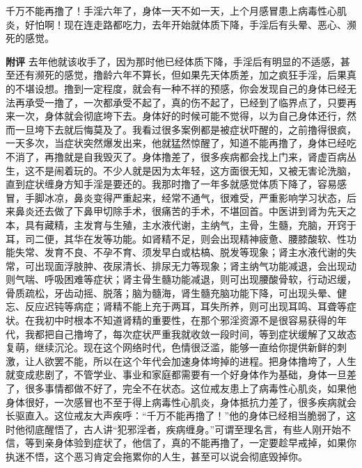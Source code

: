 \begin{case}
    千万不能再撸了！手淫六年了，身体一天不如一天，上个月感冒患上病毒性心肌炎，好怕啊！现在连走路都吃力，去年开始就体质下降，手淫后有头晕、恶心、濒死的感觉。

    \textbf{附评} 去年他就该收手了，因为那时他已经体质下降，手淫后有明显的不适感，甚至还有濒死的感觉，撸龄六年不算长，但如果先天体质差，加之疯狂手淫，后果真的不堪设想。撸到一定程度，就会有一种不祥的预感，你会发现自己的身体已经无法再承受一撸了，一次都承受不起了，真的伤不起了，已经到了临界点了，只要再来一次，身体就会彻底垮下去。身体好的时候可能不觉得，以为自己身体还行，然而一旦垮下去就后悔莫及了。我看过很多案例都是被症状吓醒的，之前撸得很疯，一天多次，当症状突然爆发出来，他就猛然惊醒了，知道不能再撸了，身体已经吃不消了，再撸就是自我毁灭了。身体撸差了，很多疾病都会找上门来，肾虚百病丛生，这不是闹着玩的。不少人就是因为太年轻，这方面很无知，又被无害论洗脑，直到症状缠身方知手淫是要还的。我那时撸了一年多就感觉体质下降了，容易感冒，手脚冰凉，鼻炎变得严重起来，经常不通气，很难受，严重影响学习状态，后来鼻炎还去做了下鼻甲切除手术，很痛苦的手术，不堪回首。中医讲到肾为先天之本，具有藏精，主发育与生殖，主水液代谢，主纳气，主骨，生髓，充脑，开窍于耳，司二便，其华在发等功能。如肾精不足，则会出现精神疲惫、腰膝酸软、性功能失常、发育不良、不孕不育、须发早白或枯槁、脱发等现象；肾主水液代谢的失常，可出现面浮肢肿、夜尿清长、排尿无力等现象；肾主纳气功能减退，会出现动则气喘、呼吸困难等症状；肾主骨生髓功能减退，则可出现腰酸骨软，行动迟缓，骨质疏松，牙齿动摇、脱落；脑为髓海，肾生髓充脑功能下降，可出现头晕、健忘、反应迟钝等病症；肾精不能上充于两耳，耳失所养，则可出现耳鸣、耳聋等症状。在我初中时根本不知道肾精的重要性，在那个邪淫资源不是很容易获得的年代，我都把自己撸垮了，每次症状严重我就收敛一段时间，等到症状缓解了又故态复萌，继续沉沦。现在这个网络时代，色情很泛滥，能够一直给你提供新鲜的刺激，让人欲罢不能，所以在这个年代会加速身体垮掉的进程。把身体撸垮了，人生就变成悲剧了，不管学业、事业和家庭都需要有一个好身体作为基础，身体一旦差了，很多事情都做不好了，完全不在状态。这位戒友患上了病毒性心肌炎，如果他身体很好，一次感冒也不至于得上病毒性心肌炎，身体抵抗力差了，很多疾病就会长驱直入。这位戒友大声疾呼：“千万不能再撸了！”他的身体已经相当脆弱了，这时他彻底醒悟了，古人讲“犯邪淫者，疾病缠身。”可谓至理名言，有些人刚开始不信，等到亲身体验到症状了，他信了，真的不能再撸了，一定要趁早戒掉，如果你执迷不悟，这个恶习肯定会拖累你的人生，甚至可以说会彻底毁掉你。
\end{case}


